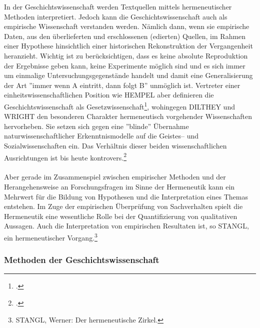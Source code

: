 \documentclass[12pt,a4paper]{article}
\begin{document}
In der Geschichtswissenschaft werden Textquellen mittels hermeneutischer Methoden interpretiert. Jedoch kann die Geschichtswissenschaft auch als empirische Wissenschaft verstanden werden. Nämlich dann, wenn sie empirische Daten, aus den überlieferten und erschlossenen (edierten) Quellen, im Rahmen einer Hypothese hinsichtlich einer historischen Rekonstruktion der Vergangenheit heranzieht. Wichtig ist zu berücksichtigen, dass es keine absolute Reproduktion der Ergebnisse geben kann, keine Experimente möglich sind und es sich immer um einmalige Untersuchungsgegenstände handelt und damit eine Generalisierung der Art ''immer wenn A eintritt, dann folgt B'' unmöglich ist. Vertreter einer einheitswissenschaftlichen Position wie HEMPEL aber definieren die Geschichtswissenschaft als Gesetzwissenschaft\footcite[][S.79-80]{nussel2018offenbarung}, wohingegen DILTHEY und WRIGHT den besonderen Charakter hermeneutisch vorgehender Wissenschaften hervorheben. Sie setzen sich gegen eine ''blinde'' Übernahme naturwissenschaftlicher Erkenntnismodelle auf die Geistes-- und Sozialwissenschaften ein. Das Verhältnis dieser beiden wissenschaftlichen Ausrichtungen ist bis heute kontrovers.\footcite{wellmer1979georg}
\\
\\
Aber gerade im Zusammenspiel zwischen empirischer Methoden und der Herangehensweise an Forschungsfragen im Sinne der Hermeneutik kann ein Mehrwert für die Bildung von Hypothesen und die Interpretation eines Themas entstehen. Im Zuge der empirischen Überprüfung von Sachverhalten spielt die Hermeneutik eine wesentliche Rolle bei der Quantifizierung von qualitativen Aussagen. Auch die Interpretation von empirischen Resultaten ist, so STANGL, ein hermeneutischer Vorgang.\footnote{STANGL, Werner: Der hermeneutische Zirkel.}

\subsubsection{Methoden der Geschichtswissenschaft}
\label{ref:Methoden}
\end{document}
